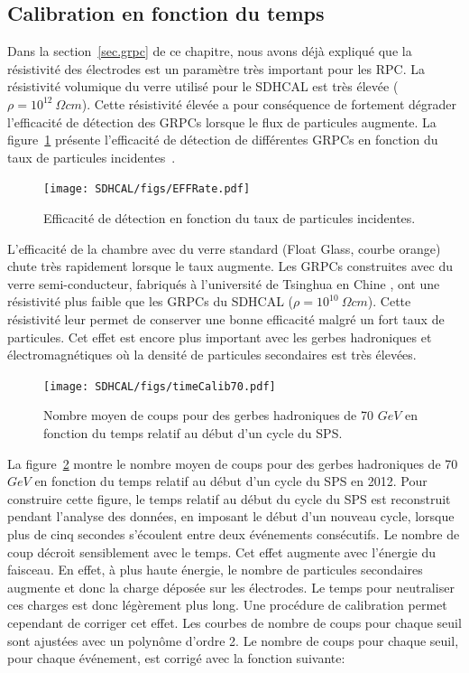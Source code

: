\subsection{Calibration en fonction du temps}
\label{sec.timeCalib}
Dans la section~\ref{sec.grpc} de ce chapitre, nous avons déjà expliqué que la résistivité des électrodes est un paramètre très important pour les RPC. La résistivité volumique du verre utilisé pour le SDHCAL est très élevée ($\rho=10^{12}~\Omega cm$). Cette résistivité élevée a pour conséquence de fortement dégrader l'efficacité de détection des GRPCs lorsque le flux de particules augmente. La figure~\ref{fig:eff_vs_rate} présente l'efficacité de détection de différentes GRPCs en fonction du taux de particules incidentes~\cite{haddad}. 
\begin{figure}[!h]
  \begin{center}
    \texttt{[image: SDHCAL/figs/EFFRate.pdf]}
    \caption{Efficacité de détection en fonction du taux de particules incidentes.}
    \label{fig:eff_vs_rate}
  \end{center}
\end{figure}
L'efficacité de la chambre avec du verre standard (Float Glass, courbe orange) chute très rapidement lorsque le taux augmente. Les GRPCs construites avec du verre semi-conducteur, fabriqués à l'université de Tsinghua en Chine \cite{yi_wang}, ont une résistivité plus faible que les GRPCs du SDHCAL ($\rho=10^{10}~\Omega cm$). Cette résistivité leur permet de conserver une bonne efficacité malgré un fort taux de particules.
Cet effet est encore plus important avec les gerbes hadroniques et électromagnétiques où la densité de particules secondaires est très élevées.
\begin{figure}[!h]
  \begin{center}
    \texttt{[image: SDHCAL/figs/timeCalib70.pdf]}
    \caption{Nombre moyen de coups pour des gerbes hadroniques de 70 $GeV$ en fonction du temps relatif au début d'un cycle du SPS.}
    \label{fig:time_correction}
  \end{center}
\end{figure}
La figure~\ref{fig:time_correction} montre le nombre moyen de coups pour des gerbes hadroniques de 70 $GeV$ en fonction du temps relatif au début d'un cycle du SPS en 2012. Pour construire cette figure, le temps relatif au début du cycle du SPS est reconstruit pendant l'analyse des données, en imposant le début d'un nouveau cycle, lorsque plus de cinq secondes s'écoulent entre deux événements consécutifs. Le nombre de coup décroit sensiblement avec le temps. Cet effet augmente avec l'énergie du faisceau. En effet, à plus haute énergie, le nombre de particules secondaires augmente et donc la charge déposée sur les électrodes. Le temps pour neutraliser ces charges est donc légèrement plus long. Une procédure de calibration permet cependant de corriger cet effet. Les courbes de nombre de coups pour chaque seuil sont ajustées avec un polynôme d'ordre 2. Le nombre de coups pour chaque seuil, pour chaque événement, est corrigé avec la fonction suivante:
